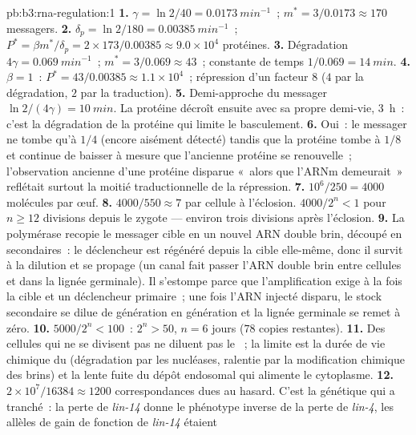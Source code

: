 \begin{solution}{pb:b3:rna-regulation:1}
\textbf{1.} $\gamma = \ln 2/40 = \qty{0.0173}{min^{-1}}$~; $m^{*} =
3/0.0173 \approx 170$ messagers.
\textbf{2.} $\delta_{p} = \ln 2/180 = \qty{0.00385}{min^{-1}}$~; $P^{*} =
\beta m^{*}/\delta_{p} = 2\times 173/0.00385 \approx 9.0\times 10^{4}$
protéines.
\textbf{3.} Dégradation $4\gamma = \qty{0.069}{min^{-1}}$~; $m^{*} = 3/0.069
\approx 43$~; constante de temps $1/0.069 = \qty{14}{min}$.
\textbf{4.} $\beta = 1$~: $P^{*} = 43/0.00385 \approx 1.1\times 10^{4}$~;
répression d'un facteur $8$ ($4$ par la dégradation, $2$ par la
traduction).
\textbf{5.} Demi-approche du messager $\ln 2/(4\gamma) = \qty{10}{min}$.
La protéine décroît ensuite avec sa propre demi-vie, \qty{3}{h}~: c'est
la dégradation de la protéine qui limite le basculement.
\textbf{6.} Oui~: le messager ne tombe qu'à $1/4$ (encore aisément
détecté) tandis que la protéine tombe à $1/8$ et continue de baisser à
mesure que l'ancienne protéine se renouvelle~; l'observation
ancienne d'une protéine disparue «~alors que l'ARNm demeurait~»
reflétait surtout la moitié traductionnelle de la répression.
\textbf{7.} $10^{6}/250 = 4000$ molécules par œuf.
\textbf{8.} $4000/550 \approx 7$ par cellule à l'éclosion. $4000/2^{n} < 1$
pour $n \ge 12$ divisions depuis le zygote --- environ trois divisions
après l'éclosion.
\textbf{9.} La polymérase recopie le messager cible en un nouvel ARN
double brin, découpé en  secondaires~: le déclencheur est
régénéré depuis la cible elle-même, donc il survit à la dilution et se
propage (un canal fait passer l'ARN double brin entre cellules et dans
la lignée germinale). Il s'estompe parce que l'amplification exige à la
fois la cible et un déclencheur primaire~; une fois l'ARN injecté
disparu, le stock secondaire se dilue de génération en génération et la
lignée germinale se remet à zéro.
\textbf{10.} $5000/2^{n} < 100$~: $2^{n} > 50$, $n = 6$ jours ($78$
copies restantes).
\textbf{11.} Des cellules qui ne se divisent pas ne diluent pas le ~;
la limite est la durée de vie chimique du  (dégradation par les
nucléases, ralentie par la modification chimique des brins) et la lente
fuite du dépôt endosomal qui alimente le cytoplasme.
\textbf{12.} $2\times 10^{7}/\num{16384} \approx \num{1200}$
correspondances dues au hasard. C'est la génétique qui a tranché~: la
perte de \emph{lin-14} donne le phénotype inverse de la perte de
\emph{lin-4}, les allèles de gain de fonction de \emph{lin-14} étaient

\end{solution}
